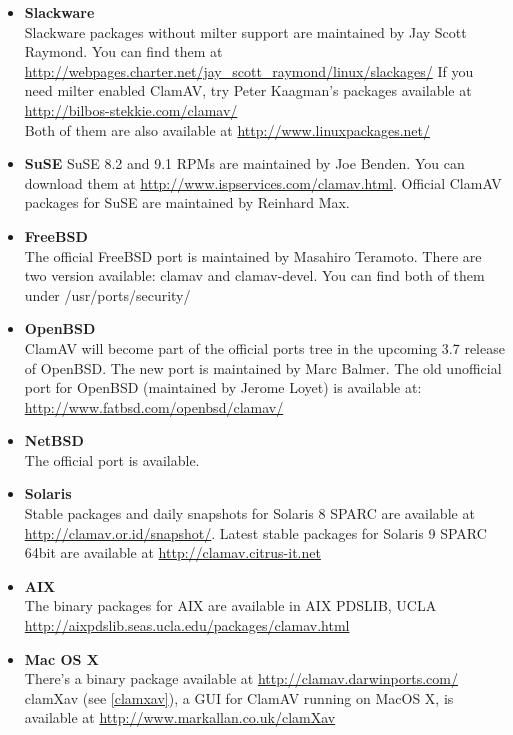 \documentclass[a4paper,titlepage,12pt]{article}
\begin{document}
\begin{itemize}
	\item \textbf{Slackware}\\
	Slackware packages without milter support are maintained by Jay Scott
	Raymond. You can find them at
	\url{http://webpages.charter.net/jay_scott_raymond/linux/slackages/}
	If you need milter enabled ClamAV, try Peter Kaagman's packages
	available at \url{http://bilbos-stekkie.com/clamav/}\\ Both of them are
	also available at \url{http://www.linuxpackages.net/}

	\item \textbf{SuSE}
	SuSE 8.2 and 9.1 RPMs are maintained by Joe Benden. You can download
	them at \url{http://www.ispservices.com/clamav.html}. Official ClamAV
	packages for SuSE are maintained by Reinhard Max.

	\item \textbf{FreeBSD}\\
	The official FreeBSD port is maintained by Masahiro Teramoto. There
	are two version available: clamav and clamav-devel. You can find both
	of them under /usr/ports/security/

	\item \textbf{OpenBSD}\\
	ClamAV will become part of the official ports tree in the upcoming
	3.7 release of OpenBSD. The new port is maintained by Marc Balmer. The
	old unofficial port for OpenBSD (maintained by Jerome Loyet) is
	available at: \url{http://www.fatbsd.com/openbsd/clamav/}

	\item \textbf{NetBSD}\\
	The official port is available.

	\item \textbf{Solaris}\\
	Stable packages and daily snapshots for Solaris 8 SPARC are available
	at \url{http://clamav.or.id/snapshot/}. Latest stable packages for
	Solaris 9 SPARC 64bit are available at \url{http://clamav.citrus-it.net}

	\item \textbf{AIX}\\
	The binary packages for AIX are available in AIX PDSLIB, UCLA\\
	\url{http://aixpdslib.seas.ucla.edu/packages/clamav.html}

	\item \textbf{Mac OS X}\\
	There's a binary package available at
	\url{http://clamav.darwinports.com/}\\
	clamXav (see \ref{clamxav}), a GUI for ClamAV running on MacOS X, is
	available at \url{http://www.markallan.co.uk/clamXav}


\end{itemize}
\end{document}
